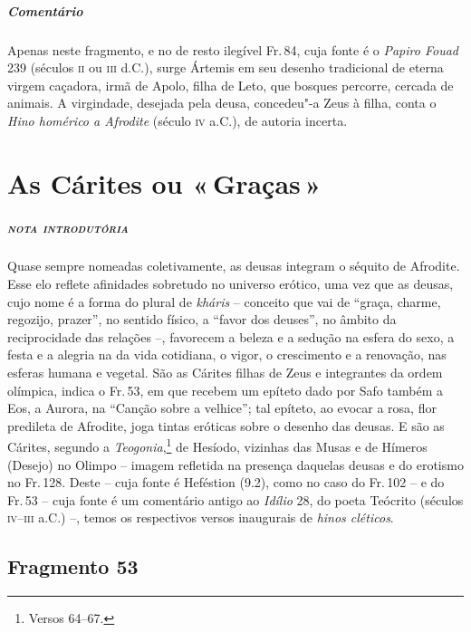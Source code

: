 \medskip

{\paragraph{Comentário} Apenas neste fragmento, e no de resto ilegível Fr.\,84, cuja fonte é o \textit{Papiro Fouad} 239 (séculos \textsc{ii} ou
\textsc{iii} d.C.), surge Ártemis em seu desenho tradicional de eterna virgem caçadora,
irmã de Apolo, filha de Leto, que bosques percorre, cercada de animais. A
virgindade, desejada pela deusa, concedeu"-a Zeus à filha, conta o \textit{Hino homérico a Afrodite} (século \textsc{iv} a.C.), de autoria incerta.}




\chapter{As Cárites ou «\,Graças\,»}

\paragraph{\textsc{nota introdutória}}
Quase sempre nomeadas coletivamente, as deusas integram o séquito de Afrodite.
Esse elo reflete afinidades sobretudo no universo erótico, uma vez que as
deusas, cujo nome é a forma do plural de \textit{kháris }-- conceito que vai de
``graça, charme, regozijo, prazer'', no sentido físico, a ``favor dos deuses'', no
âmbito da reciprocidade das relações --, favorecem a beleza e a sedução na
esfera do sexo, a festa e a alegria na da vida cotidiana, o vigor, o
crescimento e a renovação, nas esferas humana e vegetal. São as Cárites
filhas de Zeus e integrantes da ordem olímpica, indica o Fr.\,53, em que
recebem um epíteto dado por Safo também a Eos, a Aurora, na ``Canção sobre a velhice'';
tal epíteto, ao evocar a rosa, flor predileta de Afrodite, joga tintas eróticas
sobre o desenho das deusas. E são as Cárites, segundo a \textit{Teogonia},\footnote{Versos 64--67.} de Hesíodo, vizinhas das Musas e de Hímeros (Desejo) no Olimpo -- imagem refletida na presença daquelas deusas e do erotismo no Fr.\,128. Deste -- cuja fonte é Heféstion (9.2), como no caso do Fr.\,102 -- e do
Fr.\,53 -- cuja fonte é um comentário antigo ao \textit{Idílio }28, do poeta
Teócrito (séculos \textsc{iv}--\textsc{iii} a.C.) --, temos os respectivos versos inaugurais de
\textit{hinos cléticos}.

\pagebreak
\section{Fragmento 53} 

